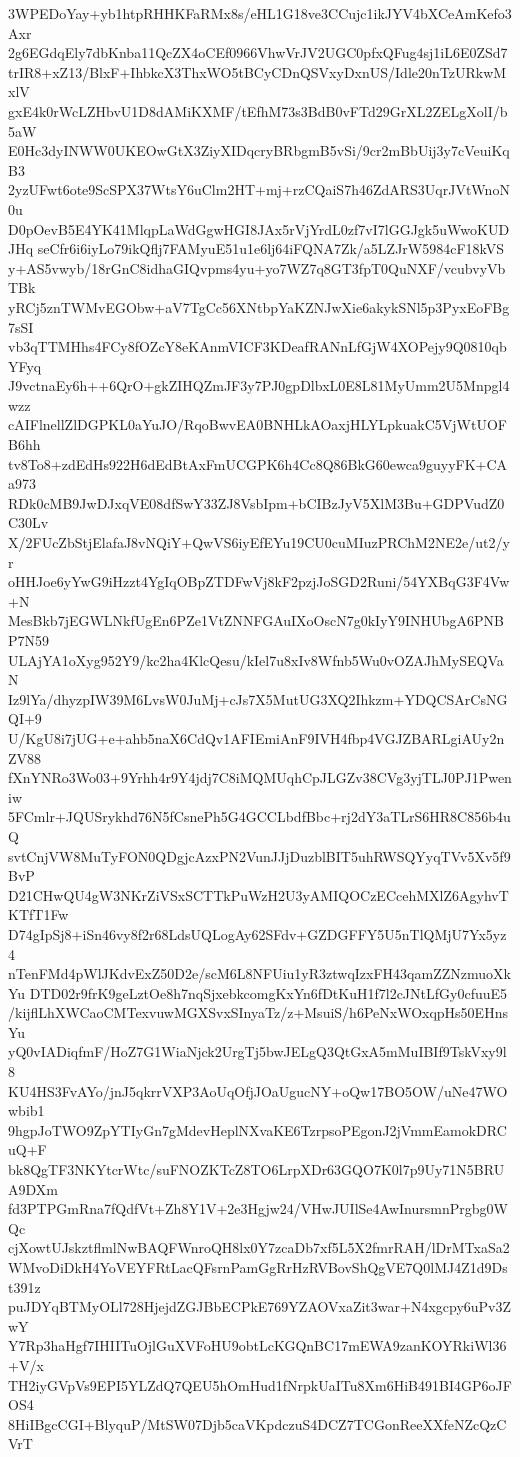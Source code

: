3WPEDoYay+yb1htpRHHKFaRMx8s/eHL1G18ve3CCujc1ikJYV4bXCeAmKefo3Axr
2g6EGdqEly7dbKnba11QcZX4oCEf0966VhwVrJV2UGC0pfxQFug4sj1iL6E0ZSd7
trIR8+xZ13/BlxF+IhbkcX3ThxWO5tBCyCDnQSVxyDxnUS/Idle20nTzURkwMxlV
gxE4k0rWcLZHbvU1D8dAMiKXMF/tEfhM73s3BdB0vFTd29GrXL2ZELgXolI/b5aW
E0Hc3dyINWW0UKEOwGtX3ZiyXIDqcryBRbgmB5vSi/9cr2mBbUij3y7cVeuiKqB3
2yzUFwt6ote9ScSPX37WtsY6uClm2HT+mj+rzCQaiS7h46ZdARS3UqrJVtWnoN0u
D0pOevB5E4YK41MlqpLaWdGgwHGI8JAx5rVjYrdL0zf7vI7lGGJgk5uWwoKUDJHq
seCfr6i6iyLo79ikQflj7FAMyuE51u1e6lj64iFQNA7Zk/a5LZJrW5984cF18kVS
y+AS5vwyb/18rGnC8idhaGIQvpms4yu+yo7WZ7q8GT3fpT0QuNXF/vcubvyVbTBk
yRCj5znTWMvEGObw+aV7TgCc56XNtbpYaKZNJwXie6akykSNl5p3PyxEoFBg7sSI
vb3qTTMHhs4FCy8fOZcY8eKAnmVICF3KDeafRANnLfGjW4XOPejy9Q0810qbYFyq
J9vctnaEy6h++6QrO+gkZIHQZmJF3y7PJ0gpDlbxL0E8L81MyUmm2U5Mnpgl4wzz
cAIFlnellZlDGPKL0aYuJO/RqoBwvEA0BNHLkAOaxjHLYLpkuakC5VjWtUOFB6hh
tv8To8+zdEdHs922H6dEdBtAxFmUCGPK6h4Cc8Q86BkG60ewca9guyyFK+CAa973
RDk0cMB9JwDJxqVE08dfSwY33ZJ8VsbIpm+bCIBzJyV5XlM3Bu+GDPVudZ0C30Lv
X/2FUcZbStjElafaJ8vNQiY+QwVS6iyEfEYu19CU0cuMIuzPRChM2NE2e/ut2/yr
oHHJoe6yYwG9iHzzt4YgIqOBpZTDFwVj8kF2pzjJoSGD2Runi/54YXBqG3F4Vw+N
MesBkb7jEGWLNkfUgEn6PZe1VtZNNFGAuIXoOscN7g0kIyY9INHUbgA6PNBP7N59
ULAjYA1oXyg952Y9/kc2ha4KlcQesu/kIel7u8xIv8Wfnb5Wu0vOZAJhMySEQVaN
Iz9lYa/dhyzpIW39M6LvsW0JuMj+cJs7X5MutUG3XQ2Ihkzm+YDQCSArCsNGQI+9
U/KgU8i7jUG+e+ahb5naX6CdQv1AFIEmiAnF9IVH4fbp4VGJZBARLgiAUy2nZV88
fXnYNRo3Wo03+9Yrhh4r9Y4jdj7C8iMQMUqhCpJLGZv38CVg3yjTLJ0PJ1Pweniw
5FCmlr+JQUSrykhd76N5fCsnePh5G4GCCLbdfBbc+rj2dY3aTLrS6HR8C856b4uQ
svtCnjVW8MuTyFON0QDgjcAzxPN2VunJJjDuzblBIT5uhRWSQYyqTVv5Xv5f9BvP
D21CHwQU4gW3NKrZiVSxSCTTkPuWzH2U3yAMIQOCzECcehMXlZ6AgyhvTKTfT1Fw
D74gIpSj8+iSn46vy8f2r68LdsUQLogAy62SFdv+GZDGFFY5U5nTlQMjU7Yx5yz4
nTenFMd4pWlJKdvExZ50D2e/scM6L8NFUiu1yR3ztwqIzxFH43qamZZNzmuoXkYu
DTD02r9frK9geLztOe8h7nqSjxebkcomgKxYn6fDtKuH1f7l2cJNtLfGy0cfuuE5
/kijflLhXWCaoCMTexvuwMGXSvxSInyaTz/z+MsuiS/h6PeNxWOxqpHs50EHnsYu
yQ0vIADiqfmF/HoZ7G1WiaNjck2UrgTj5bwJELgQ3QtGxA5mMuIBIf9TskVxy9l8
KU4HS3FvAYo/jnJ5qkrrVXP3AoUqOfjJOaUgucNY+oQw17BO5OW/uNe47WOwbib1
9hgpJoTWO9ZpYTIyGn7gMdevHeplNXvaKE6TzrpsoPEgonJ2jVmmEamokDRCuQ+F
bk8QgTF3NKYtcrWtc/suFNOZKTcZ8TO6LrpXDr63GQO7K0l7p9Uy71N5BRUA9DXm
fd3PTPGmRna7fQdfVt+Zh8Y1V+2e3Hgjw24/VHwJUIlSe4AwInursmnPrgbg0WQc
cjXowtUJskztflmlNwBAQFWnroQH8lx0Y7zcaDb7xf5L5X2fmrRAH/lDrMTxaSa2
WMvoDiDkH4YoVEYFRtLacQFsrnPamGgRrHzRVBovShQgVE7Q0lMJ4Z1d9Dst391z
puJDYqBTMyOLl728HjejdZGJBbECPkE769YZAOVxaZit3war+N4xgcpy6uPv3ZwY
Y7Rp3haHgf7IHIITuOjlGuXVFoHU9obtLcKGQnBC17mEWA9zanKOYRkiWl36+V/x
TH2iyGVpVs9EPI5YLZdQ7QEU5hOmHud1fNrpkUaITu8Xm6HiB491BI4GP6oJFOS4
8HiIBgcCGI+BlyquP/MtSW07Djb5caVKpdczuS4DCZ7TCGonReeXXfeNZcQzCVrT
